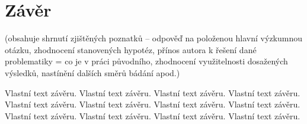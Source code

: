 \chapter*{Závěr}

{\color{infoBlue}
(obsahuje shrnutí zjištěných poznatků – odpověď na položenou hlavní výzkumnou otázku, zhodnocení stanovených hypotéz, přínos autora k řešení dané problematiky = co je v práci původního, zhodnocení využitelnosti dosažených výsledků, nastínění dalších směrů bádání apod.)
}

Vlastní text závěru. Vlastní text závěru. Vlastní text závěru. Vlastní text závěru. Vlastní text závěru. Vlastní text závěru. Vlastní text závěru. Vlastní text závěru. Vlastní text závěru. Vlastní text závěru. Vlastní text závěru. Vlastní text závěru.

\pagebreak
